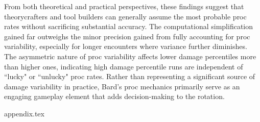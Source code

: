 \documentclass[journal,twocolumn]{IEEEtran}
\begin{document}
From both theoretical and practical perspectives, these findings suggest that theorycrafters and tool builders can generally assume the most probable proc rates without sacrificing substantial accuracy. The computational simplification gained far outweighs the minor precision gained from fully accounting for proc variability, especially for longer encounters where variance further diminishes. The asymmetric nature of proc variability affects lower damage percentiles more than higher ones, indicating high damage percentile runs are independent of ``lucky" or ``unlucky" proc rates. Rather than representing a significant source of damage variability in practice, Bard's proc mechanics primarily serve as an engaging gameplay element that adds decision-making to the rotation.

{appendix.tex}

 
 
\end{document}

